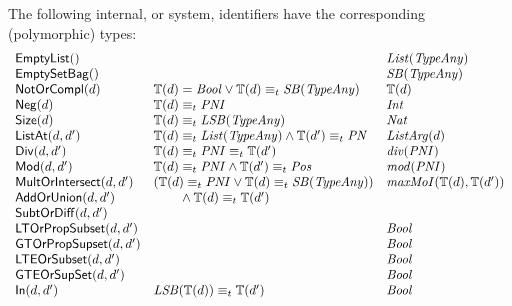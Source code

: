 \documentclass[fleqn,a4paper,dvips]{article}
\newcommand{\aterm}[1]{\mathsf{#1}}
\newcommand{\type}{\mathbb{T}}
\newcommand{\PNI}{\nm{PNI}}
\newcommand{\PN}{\nm{PN}}
\newcommand{\SB}{\nm{SB}}
\newcommand{\LSB}{\nm{LSB}}
\newcommand{\List}{\nm{List}}
\newcommand{\TypeAny}{\nm{TypeAny}}
\newcommand{\typecompat}{\equiv_t}
\newcommand{\Int}{\nm{Int}}
\newcommand{\Pos}{\nm{Pos}}
\begin{document}
{The following internal, or system, identifiers have the corresponding (polymorphic) types:
\begin{displaymath}
\begin{array}{lll}
\aterm{EmptyList}()                  &                                                            & \List(\TypeAny)\\
\aterm{EmptySetBag}()                &                                                            & \SB(\TypeAny)\\
\aterm{NotOrCompl}(d)                & \type(d)=\Bool\lor\type(d)\typecompat\SB(\TypeAny)         & \type(d)\\
\aterm{Neg}(d)                       & \type(d)\typecompat\PNI                                    & \Int\\
\aterm{Size}(d)                      & \type(d)\typecompat\LSB(\TypeAny)                          & \Nat\\
\aterm{ListAt}(d, d')                & \type(d)\typecompat\List(\TypeAny)\land\type(d')\typecompat\PN & \nm{ListArg}(d)\\
\aterm{Div}(d, d')                   & \type(d)\typecompat\PNI\typecompat\type(d')                & \nm{div}(\PNI)\\
\aterm{Mod}(d, d')                   & \type(d)\typecompat\PNI\land\type(d')\typecompat\Pos       & \nm{mod}(\PNI)\\
\aterm{MultOrIntersect}(d, d')       & (\type(d)\typecompat\PNI\lor\type(d)\typecompat\SB(\TypeAny))
                                                                                                  & \nm{maxMoI}(\type(d),\type(d'))\\
\aterm{AddOrUnion}(d, d')            & \t2\land\type(d)\typecompat\type(d')                          &\\
\aterm{SubtOrDiff}(d, d')            &                                                            &\\
\aterm{LTOrPropSubset}(d, d')        &                                                            & \Bool\\
\aterm{GTOrPropSupset}(d, d')        &                                                            & \Bool\\
\aterm{LTEOrSubset}(d, d')           &                                                            & \Bool\\
\aterm{GTEOrSupSet}(d, d')           &                                                            & \Bool\\
\aterm{In}(d, d')                    & \LSB(\type(d))\typecompat\type(d')                         & \Bool\\

\end{array}
\end{displaymath}}
\end{document}
